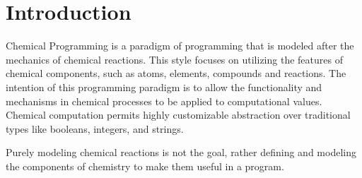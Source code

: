 
\section{Introduction}

Chemical Programming is a paradigm of programming that is modeled after the mechanics of chemical reactions. This style focuses on utilizing the features of chemical components, such as atoms, elements, compounds and reactions. The intention of this programming paradigm is to allow the functionality and mechanisms in chemical processes to be applied to computational values. Chemical computation permits highly customizable abstraction over traditional types like booleans, integers, and strings.

\par Purely modeling chemical reactions is not the goal, rather defining and modeling the components of chemistry to make them useful in a program. 